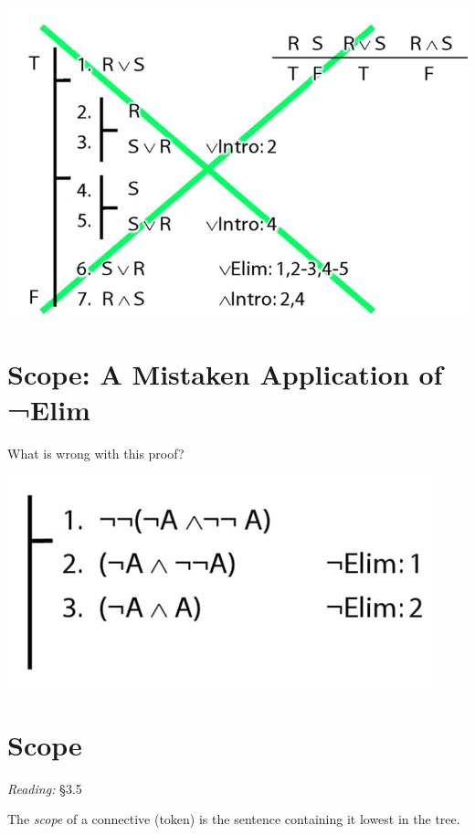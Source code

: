 \documentclass[12pt]{extarticle}
\begin{document}
\begin{multicols*}{3}
\begin{center}
\includegraphics[scale=0.3]{img/unit_224_subproofs_tricky.png}
\end{center}
 
 
\section{Scope: A Mistaken Application of ¬Elim}
 
What is wrong with this proof?
 
\begin{center}
\includegraphics[scale=0.3]{img/proof_negation_elim_wrong.png}
\end{center}
 
 
\section{Scope}
 
\emph{Reading:} §3.5
 
The \emph{scope} of a connective (token) is the sentence containing it lowest in the tree.
 

\end{multicols*}
\end{document}
